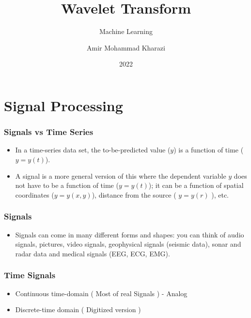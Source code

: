 \documentclass{beamer}
\title{Wavelet Transform}
\subtitle{Machine Learning}
\author{Amir Mohammad Kharazi}
\institute{Tarbiat Modares University\\\vspace{10mm}
\github
}
\date{2022}
\begin{document}
	
	
	
	\frame {
		\titlepage
	}
	
	\section{Signal Processing}
	\begin{frame}
		\frametitle{Signals vs Time Series}
		
		\begin{itemize}
			\item
			In a time-series data set, the to-be-predicted value ($y$) is a function of time ($y = y(t)$).
			
			\item
			
			A signal is a more general version of this where the dependent variable $y$ does not have to be a function of time ($y = y(t)$);  it can be a function of spatial coordinates ($y = y(x, y)$), distance from the source ( $y = y(r)$ ), etc. 
			
		\end{itemize}	
	\end{frame}
	
	\begin{frame}
		\frametitle{Signals}
		\begin{itemize}
			\item
			
			 Signals can come in many different forms and shapes: you can think of audio signals, pictures, video signals, geophysical signals (seismic data), sonar and radar data and medical signals (EEG, ECG, EMG).
			
		\end{itemize}


		
		
	\end{frame}
	
	\begin{frame}
		\frametitle{Time Signals}
		
		\begin{itemize}
			\item 
			Continuous time-domain ( Most of real Signals ) - Analog
			\item
			Discrete-time domain ( Digitized version )
		\end{itemize}

	\end{frame}
	
\end{document}
